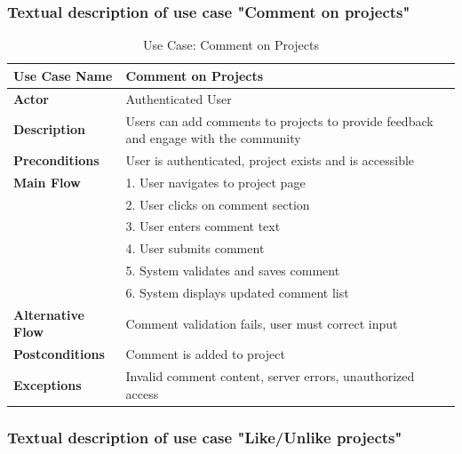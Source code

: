 \subsubsection{Textual description of use case "Comment on projects"}

\begin{table}[H]
\centering
\caption{Use Case: Comment on Projects}
\begin{tabular}{|p{3cm}|p{10cm}|}
\hline
\textbf{Use Case Name} & Comment on Projects \\
\hline
\textbf{Actor} & Authenticated User \\
\hline
\textbf{Description} & Users can add comments to projects to provide feedback and engage with the community \\
\hline
\textbf{Preconditions} & User is authenticated, project exists and is accessible \\
\hline
\textbf{Main Flow} & 
1. User navigates to project page \\
& 2. User clicks on comment section \\
& 3. User enters comment text \\
& 4. User submits comment \\
& 5. System validates and saves comment \\
& 6. System displays updated comment list \\
\hline
\textbf{Alternative Flow} & Comment validation fails, user must correct input \\
\hline
\textbf{Postconditions} & Comment is added to project \\
\hline
\textbf{Exceptions} & Invalid comment content, server errors, unauthorized access \\
\hline
\end{tabular}
\end{table}

\subsubsection{Textual description of use case "Like/Unlike projects"}

